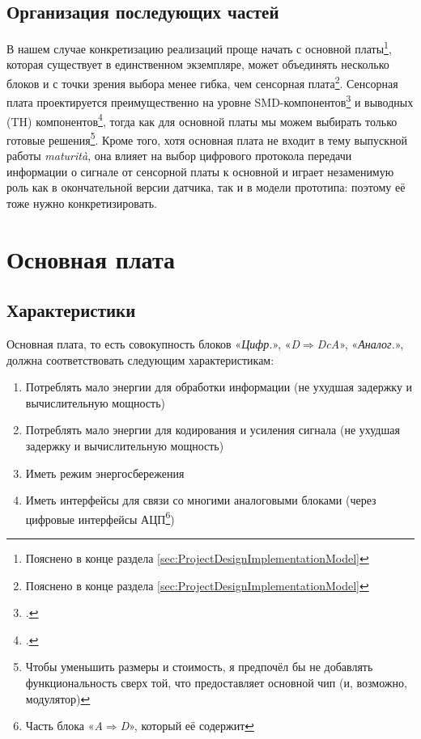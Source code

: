 \documentclass[a4paper, 10pt, final]{article} %
\begin{document}
    \subsection{Организация последующих частей}
    В нашем случае конкретизацию реализаций проще начать с основной платы\footnote{Пояснено в конце раздела \ref{sec:ProjectDesignImplementationModel}}, которая существует в единственном экземпляре, может объединять несколько блоков и с точки зрения выбора менее гибка, чем сенсорная плата\footnote{Пояснено в конце раздела \ref{sec:ProjectDesignImplementationModel}}.
    Сенсорная плата проектируется преимущественно на уровне SMD-компонентов\footcite[]{SMT:Wiki} и выводных (TH) компонентов\footcite[]{THT:Wiki}, тогда как для основной платы мы можем выбирать только готовые решения\footnote{Чтобы уменьшить размеры и стоимость, я предпочёл бы не добавлять функциональность сверх той, что предоставляет основной чип (и, возможно, модулятор)}.
    Кроме того, хотя основная плата не входит в тему выпускной работы \emph{maturit\`{a}}, она влияет на выбор цифрового протокола передачи информации о сигнале от сенсорной платы к основной и играет незаменимую роль как в окончательной версии датчика, так и в модели прототипа: поэтому её тоже нужно конкретизировать.

    \section{Основная плата}\label{sec:Motherboard}
    \begin{samepage}
        \subsection{Характеристики}\label{sec:MotherboardCharacteristics}
            Основная плата, то есть совокупность блоков «\emph{Цифр.}», «\emph{D$\Rightarrow$DcA}», «\emph{Аналог.}», должна соответствовать следующим характеристикам:
            \begin{enumerate}[label=\emph{(\arabic*)}]
                \item Потреблять мало энергии для обработки информации (не ухудшая задержку и вычислительную мощность)
                \item Потреблять мало энергии для кодирования и усиления сигнала (не ухудшая задержку и вычислительную мощность)
                \item Иметь режим энергосбережения
                \item Иметь интерфейсы для связи со многими аналоговыми блоками (через цифровые интерфейсы АЦП\footnote{Часть блока «\emph{A$\Rightarrow$D}», который её содержит})
            \end{enumerate}
    \end{samepage}
\end{document}
